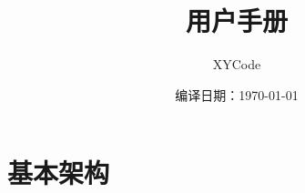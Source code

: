 \documentclass[UTF8]{ctexart}
\title{\itswa 用户手册}
\author{XYCode}
\date{编译日期：\today}
\begin{document}
    \maketitle

    \tableofcontents

    \section{基本架构}
\end{document}
